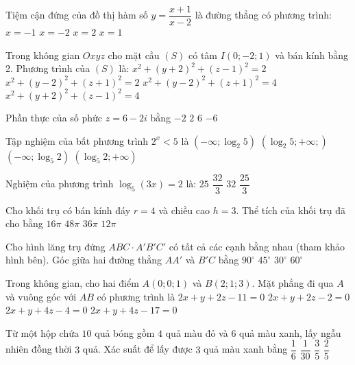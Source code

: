 \begin{ex}%
Tiệm cận đứng của đồ thị hàm số $y=\dfrac{x+1}{x-2}$ là đường thẳng có phương trình:
\choice
{$x=-1$}
{$x=-2$}
{\True $x=2$}
{$x=1$}

\end{ex}
\begin{ex}%
Trong không gian $O x y z$ cho mặt cầu $(S)$ có tâm $I(0;-2; 1)$ và bán kính bằng 2. Phương trình của $(S)$ là:
\choice
{$x^2+(y+2)^2+(z-1)^2=2$}
{$x^2+(y-2)^2+(z+1)^2=2$}
{$x^2+(y-2)^2+(z+1)^2=4$}
{\True $x^2+(y+2)^2+(z-1)^2=4$}

\end{ex}
\begin{ex}%
Phần thực của số phức $z=6-2 i$ bằng
\choice
{$-2$}
{$2$}
{\True $6$}
{$-6$}

\end{ex}
\begin{ex}%
Tập nghiệm của bất phương trình $2^{x}<5$ là
\choice
{\True $\left(-\infty; \log_2 5\right)$}
{$\left(\log_2 5;+\infty;\right)$}
{$\left(-\infty; \log_5 2\right)$}
{$\left(\log_5 2;+\infty\right)$}

\end{ex}
\begin{ex}%
Nghiệm của phương trình $\log_5(3 x)=2$ là:
\choice
{$25$}
{$\dfrac{32}{3}$}
{$32$}
{\True $\dfrac{25}{3}$}

\end{ex}
\begin{ex}%
Cho khối trụ có bán kính đáy $r=4$ và chiều cao $h=3$. Thể tích của khối trụ đã cho bằng
\choice
{$16\pi$}
{\True $48\pi$}
{$36\pi$}
{$12\pi$}

\end{ex}
\begin{ex}%
Cho hình lăng trụ đứng $ABC \cdot A'B'C'$ có tất cả các cạnh bằng nhau (tham khảo hình bên). Góc giữa hai đường thẳng $AA'$ và $B'C$ bằng
\choice
{$90^{\circ}$}
{\True $45^{\circ}$}
{$30^{\circ}$}
{$60^{\circ}$}

\end{ex}
\begin{ex}%
Trong không gian, cho hai điểm $A(0; 0; 1)$ và $B(2; 1; 3)$. Mặt phẳng đi qua $A$ và vuông góc với $AB$ có phương trình là
\choice
{$2 x+y+2 z-11=0$}
{\True $2 x+y+2 z-2=0$}
{$2 x+y+4 z-4=0$}
{$2 x+y+4 z-17=0$}

\end{ex}
\begin{ex}%
Từ một hộp chứa $10$ quả bóng gồm $4$ quả màu đỏ và $6$ quả màu xanh, lấy ngẫu nhiên đồng thời $3$ quả. Xác suất để lấy được $3$ quả màu xanh bằng
\choice
{\True $\dfrac{1}{6}$}
{$\dfrac{1}{30}$}
{$\dfrac{3}{5}$}
{$\dfrac{2}{5}$}

\end{ex}
